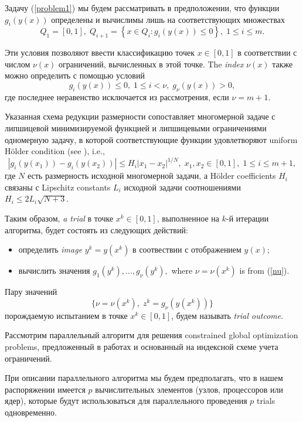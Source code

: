 \documentclass[
11pt,%
tightenlines,%
twoside,%
onecolumn,%
nofloats,%
nobibnotes,%
nofootinbib,%
superscriptaddress,%
noshowpacs,%
centertags]%
{revtex4}
\begin{document}
Задачу (\ref{problem1}) мы будем рассматривать в предположении, что функции $g_i(y(x))$ определены и вычислимы лишь на соответствующих множествах 
\[
Q_1=[0,1], \; Q_{i+1}=\left\{x \in Q_i : g_i(y(x)) \leq 0 \right\}, \; 1 \leq i \leq m.
\]

Эти условия позволяют ввести классификацию точек $x \in [0,1]$ в соответствии с числом $\nu (x)$ ограничений, вычисленных в этой точке. The \textit{index} $\nu(x)$ также можно определить с помощью условий
\begin{equation}\label{nu}
g_i(y(x)) \leq 0, \; 1 \leq i < \nu, \; g_\nu(y(x))>0,
\end{equation}
где последнее неравенство исключается из рассмотрения, если $\nu=m+1$.

Указанная схема редукции размерности сопоставляет многомерной задаче с липшицевой минимизируемой функцией и липшицевыми ограничениями одномерную задачу, в которой соответствующие функции удовлетворяют uniform H{\"o}lder condition (see \cite{Sergeyev2013}), i.e.,
\[
\left|g_i(y(x_1))-g_i (y(x_2))\right| \leq H_i \left|x_1-x_2 \right|^{1/N}, \; x_1,x_2\in [0,1], \; 
1\leq i \leq m+1,
\]
где $N$ есть размерность исходной многомерной задачи, а H{\"o}lder coefficients $H_i$ связаны с Lipschitz constants $L_i$ исходной задачи соотношениями $H_i \leq 2L_i \sqrt{N+3}$.

Таким образом, \textit{a trial} в точке $x^k \in [0,1]$, выполненное на $k$-й итерации алгоритма, будет состоять из следующих действий:
\begin{itemize}
	\item определить \textit{image} $y^k=y(x^k)$ в соотвествии с отображением $y(x)$;
	\item вычислить значения $g_1(y^k),..., g_\nu(y^k),$ where $\nu = \nu(x^k)$ is from (\ref{nu}). 
\end{itemize}
Пару значений 
\begin{equation} \label{trial_result}
 \{ \nu=\nu(x^k), \; z^k=g_\nu(y(x^k)) \} 
\end{equation}
порождаемую испытанием в точке $x^k \in [0,1]$, будем называть \textit{trial outcome}.

Рассмотрим параллельный алгоритм для решения constrained global optimization problems, предложенный в работах \cite{Strongin2000,Strongin2013} и основанный на индексной схеме учета ограничений. 

При описании параллельного алгоритма мы будем предполагать, что в нашем распоряжении имеется $p$ вычислительных элементов (узлов, процессоров или ядер), которые будут использоваться для параллельного проведения $p$ trials одновременно. 
\end{document}
